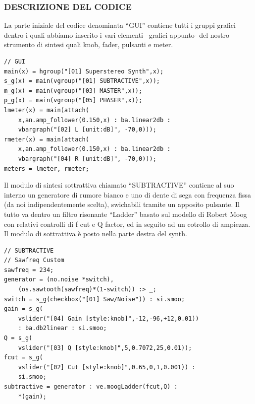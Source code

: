 \documentclass[
	a4paper,
	twocolumn
	]{article}
\begin{document}
\subsubsection*{DESCRIZIONE DEL CODICE}
La parte iniziale del codice denominata “GUI” contiene tutti i gruppi grafici dentro i quali abbiamo inserito i vari elementi –grafici appunto- del nostro strumento di sintesi quali knob, fader, pulsanti e meter.

\begin{lstlisting}
// GUI
main(x) = hgroup("[01] Superstereo Synth",x);
s_g(x) = main(vgroup("[01] SUBTRACTIVE",x));
m_g(x) = main(vgroup("[03] MASTER",x));
p_g(x) = main(vgroup("[05] PHASER",x));
lmeter(x) = main(attach(
	x,an.amp_follower(0.150,x) : ba.linear2db :
	vbargraph("[02] L [unit:dB]", -70,0)));
rmeter(x) = main(attach(
	x,an.amp_follower(0.150,x) : ba.linear2db :
	vbargraph("[04] R [unit:dB]", -70,0)));
meters = lmeter, rmeter;
\end{lstlisting}

Il modulo di sintesi sottrattiva chiamato “SUBTRACTIVE” contiene al suo interno un generatore di rumore bianco e uno di dente di sega con frequenza fissa (da noi indipendentemente scelta), swichabili tramite un apposito pulsante. Il tutto va dentro un filtro risonante “Ladder” basato sul modello di Robert Moog con relativi controlli di f cut e Q factor, ed in seguito ad un cotrollo di ampiezza.
Il modulo di sottrattiva è posto nella parte destra del synth.




\begin{lstlisting}
// SUBTRACTIVE
// Sawfreq Custom
sawfreq = 234;
generator = (no.noise *switch),
	(os.sawtooth(sawfreq)*(1-switch)) :> _;
switch = s_g(checkbox("[01] Saw/Noise")) : si.smoo;
gain = s_g(
	vslider("[04] Gain [style:knob]",-12,-96,+12,0.01))
	: ba.db2linear : si.smoo;
Q = s_g(
	vslider("[03] Q [style:knob]",5,0.7072,25,0.01));
fcut = s_g(
	vslider("[02] Cut [style:knob]",0.65,0,1,0.001)) :
	si.smoo;
subtractive = generator : ve.moogLadder(fcut,Q) :
	*(gain);
\end{lstlisting}
\end{document}
